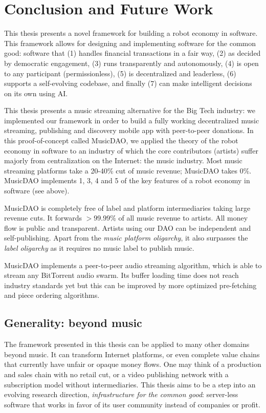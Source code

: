 \chapter{Conclusion and Future Work}
This thesis presents a novel framework for building a robot economy in software. This framework allows for designing and implementing software for the common good: software that (1) handles financial transactions in a fair way, (2) as decided by democratic engagement, (3) runs transparently and autonomously, (4) is open to any participant (permissionless), (5) is decentralized and leaderless, (6) supports a self-evolving codebase, and finally (7) can make intelligent decisions on its own using AI.

This thesis presents a music streaming alternative for the Big Tech industry: we implemented our framework in order to build a fully working decentralized music streaming, publishing and discovery mobile app with peer-to-peer donations. In this proof-of-concept called MusicDAO, we applied the theory of the robot economy in software to an industry of which the core contributors (artists) suffer majorly from centralization on the Internet: the music industry. Most music streaming platforms take a 20-40\% cut of music revenue; MusicDAO takes 0\%. MusicDAO implements 1, 3, 4 and 5 of the key features of a robot economy in software (see above).

MusicDAO is completely free of label and platform intermediaries taking large revenue cuts. It forwards $>99.99\%$ of all music revenue to artists. All money flow is public and transparent. Artists using our DAO can be independent and self-publishing. Apart from the \textit{music platform oligarchy}, it also surpasses the \textit{label oligarchy} as it requires no music label to publish music.

MusicDAO implements a peer-to-peer audio streaming algorithm, which is able to stream any BitTorrent audio swarm. Its buffer loading time does not reach industry standards yet but this can be improved by more optimized pre-fetching and piece ordering algorithms. 

\section{Generality: beyond music}
The framework presented in this thesis can be applied to many other domains beyond music. It can transform Internet platforms, or even complete value chains that currently have unfair or opaque money flows. One may think of a production and sales chain with no retail cut, or a video publishing network with a subscription model without intermediaries. This thesis aims to be a step into an evolving research direction, \textit{infrastructure for the common good}: %
server-less software that works in favor of its user community instead of companies or profit.

